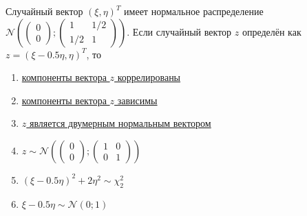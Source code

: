 \documentclass[t]{beamer}
\newcommand{\cN}{\mathcal{N}}
\begin{document}
 \begin{frame} \label{27} 
\begin{block}{27} 

    Случайный вектор $(\xi, \eta)^T$ имеет нормальное распределение
    $\cN \left(
    \begin{pmatrix}
      0 \\
      0
    \end{pmatrix};
    \begin{pmatrix}
      1 & 1/2 \\
      1/2 & 1
    \end{pmatrix}
  \right)$. Если случайный вектор $z$ определён как $z=(\xi - 0.5\eta, \eta)^T$, то
  


 \end{block} 
\begin{enumerate} 
\item[] \hyperlink{27-No}{\beamergotobutton{} компоненты вектора $z$ коррелированы}
\item[] \hyperlink{27-No}{\beamergotobutton{} компоненты вектора $z$ зависимы}
\item[] \hyperlink{27-Yes}{\beamergotobutton{} $z$ является двумерным нормальным вектором}
\item[] \hyperlink{27-No}{\beamergotobutton{} $z \sim \cN \left(
      \begin{pmatrix}
        0 \\
        0
      \end{pmatrix};
      \begin{pmatrix}
        1 & 0 \\
        0 & 1
      \end{pmatrix}
    \right)$}
\item[] \hyperlink{27-No}{\beamergotobutton{} $(\xi - 0.5\eta)^2 + 2\eta^2 \sim \chi_2^2$}
\item[] \hyperlink{27-No}{\beamergotobutton{} $\xi - 0.5\eta \sim \cN(0;1)$}
\end{enumerate} 
\end{frame} 
\end{document}
